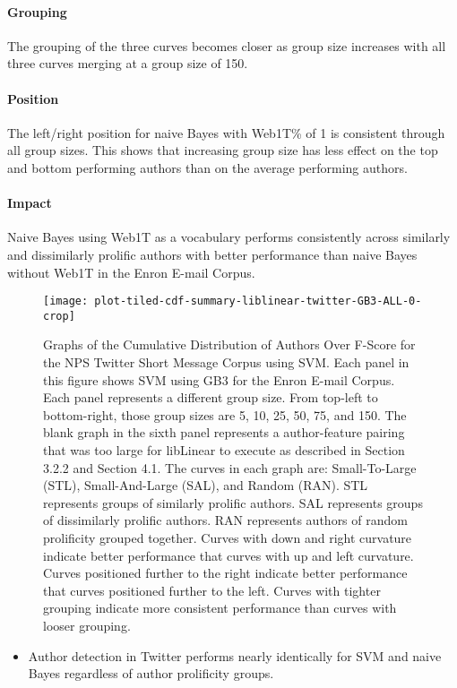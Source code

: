 \paragraph*{Grouping}The grouping of the three curves becomes closer as group size increases with all three curves merging at a group size of 150. 
\paragraph*{Position} The left/right position for naive Bayes with Web1T\% of 1 is consistent through all group sizes. This shows that increasing group size has less effect on the top and bottom performing authors than on the average performing authors.
\paragraph*{Impact} Naive Bayes using Web1T as a vocabulary performs consistently across similarly and dissimilarly prolific authors with better performance than naive Bayes without Web1T in the Enron E-mail Corpus.


	\begin{figure}[htbp!]
		\begin{center}
		\centering
		\texttt{[image: plot-tiled-cdf-summary-liblinear-twitter-GB3-ALL-0-crop]}
		\caption{Graphs of the Cumulative Distribution of Authors Over F-Score for the NPS Twitter Short Message Corpus using SVM. Each panel in this figure shows SVM using GB3 for the Enron E-mail Corpus.  Each panel represents a different group size.  From top-left to bottom-right, those group sizes are 5, 10, 25, 50, 75, and 150.   The blank graph in the sixth panel represents a author-feature pairing that was too large for libLinear to execute as described in Section 3.2.2 and Section 4.1.  The curves in each graph are: Small-To-Large (STL), Small-And-Large (SAL), and Random (RAN).  STL represents groups of similarly prolific authors.  SAL represents groups of dissimilarly prolific authors.  RAN represents authors of random prolificity grouped together.  Curves with down and right curvature indicate better performance that curves with up and left curvature.  Curves positioned further to the right indicate better performance that curves positioned further to the left.  Curves with tighter grouping indicate more consistent performance than curves with looser grouping.}
		\label{fig:plot-tiled-cdf-summary-liblinear-twitter-GB3-ALL-0}
		\end{center}
	\end{figure}
\begin{itemize}
	\item Author detection in Twitter performs nearly identically for SVM and naive Bayes regardless of author prolificity groups.
\end{itemize} 

